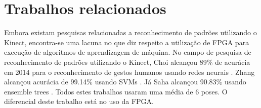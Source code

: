 \section{Trabalhos relacionados}

Embora existam pesquisas relacionadas a reconhecimento de padrões utilizando o Kinect, encontra-se uma lacuna no que diz respeito a
utilização de FPGA para execução de algoritmos de aprendizagem de máquina. No campo de pesquisa de reconhecimento de padrões
utilizando o Kinect, Choi alcançou 89\% de acurácia em 2014 para o reconhecimento de gestos humanos
usando redes neurais \cite{choi2014design}. Zhang alcançou acurácia de 99.14\%
usando SVMs \cite{zhang2014novel}. Já Saha alcançou 90.83\% usando ensemble trees
\cite{saha2014study}. Todos estes trabalhos usaram uma média de 6 poses. 
O diferencial deste trabalho está no uso da FPGA.